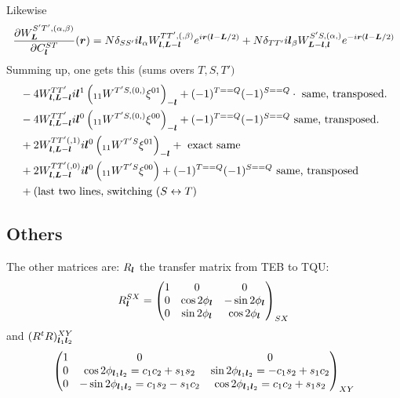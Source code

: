 \documentclass[11pt]{article}
\begin{document}
Likewise
\begin{equation}
		\frac{\partial W_{\boldsymbol{L}}^{S'T', (\alpha, \beta)}}{\partial C_{\boldsymbol{l}}^{ST}}(\boldsymbol{r}) = N\delta_{SS'}i\boldsymbol{l}_\alpha W^{TT', (,\beta)}_{\boldsymbol{l}, \boldsymbol{L}-\boldsymbol{l}}e^{i \boldsymbol{r} \left(\boldsymbol{l} - \boldsymbol{L}/2 \right)} + N \delta_{TT'} i\boldsymbol{l}_\beta W^{S'S, (\alpha,)}_{\boldsymbol{L}-\boldsymbol{l}, \boldsymbol{l}} e^{-i\boldsymbol{r}(\boldsymbol{l} -\boldsymbol{L}/2)}
\end{equation}
Summing up, one gets this (sums overs $T,S, T')$
\begin{equation}
\begin{split}
		&-4 W^{TT'}_{\boldsymbol{l}, \boldsymbol{L} - \boldsymbol{l}} i\boldsymbol{l}^1 \left(_{11}W^{T'S, (0,)} \xi^{01} \right)_{-\boldsymbol{l}} + (-1)^{T==Q}(-1)^{S==Q}\cdot\textrm{ same,  transposed}. \\
		&-4 W^{TT'}_{\boldsymbol{l}, \boldsymbol{L} - \boldsymbol{l}} i\boldsymbol{l}^0 \left(_{11}W^{T'S, (0,)} \xi^{00} \right)_{-\boldsymbol{l}} + (-1)^{T==Q}(-1)^{S==Q}\textrm{ same, transposed}. \\
		&+2 W^{TT'(,1)}_{\boldsymbol{l}, \boldsymbol{L} - \boldsymbol{l}} i \boldsymbol{l}^0 \left( _{11}W^{T'S}\xi^{01}\right)_{-\boldsymbol{l}}  + \textrm{ exact same} \\
		 &+ 2W^{TT'(,0)}_{\boldsymbol{l}, \boldsymbol{L} - \boldsymbol{l}} i \boldsymbol{l}^0 \left( _{11}W^{T'S}\xi^{00} \right)  + (-1)^{T==Q}(-1)^{S==Q}\textrm{ same, transposed}\\
		 &+ (\textrm{last two lines, switching } (S \leftrightarrow T)
\end{split}
\end{equation}
\subsection{Others}
The other matrices are: $R_{\boldsymbol{l}}$ the transfer matrix from TEB to TQU:
\begin{equation} R^{SX}_{\boldsymbol{l}} = 
	\begin{pmatrix}
		1 & 0 & 0 \\ 0 & \cos 2\phi_{\boldsymbol{l}} & -\sin 2\phi_{\boldsymbol{l}} \\ 0 & \sin 2\phi_{\boldsymbol{l}} & \cos 2\phi_{\boldsymbol{l}}
	\end{pmatrix}_{SX}
\end{equation}
and $(R^tR)^{XY}_{\boldsymbol{l}_1\boldsymbol{l}_2}$
\begin{equation}
		\begin{pmatrix}
		1 & 0 & 0 \\ 0 & \cos 2\phi_{\boldsymbol{l}_1\boldsymbol{l}_2}= c_1c_2 + s_1 s_2 & \sin 2\phi_{\boldsymbol{l}_1\boldsymbol{l}_2}= -c_1s_2 + s_1 c_2 \\ 0 & -\sin 2\phi_{\boldsymbol{l}_1\boldsymbol{l}_2}= c_1s_2 - s_1 c_2 & \cos 2\phi_{\boldsymbol{l}_1\boldsymbol{l}_2}= c_1c_2 + s_1 s_2
	\end{pmatrix}_{XY}
\end{equation}
\end{document}
